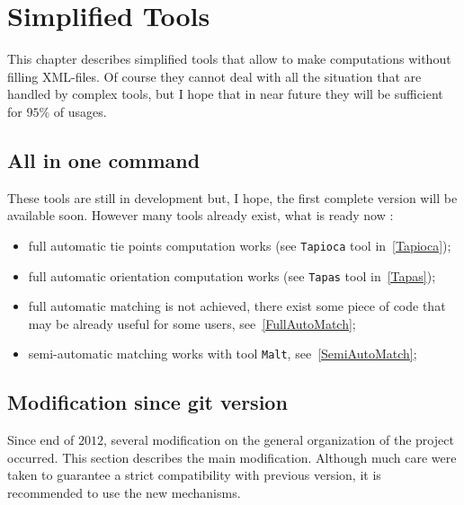 \chapter{Simplified Tools}

\label{Simp:Tool:One}


This chapter describes simplified tools that allow to make
computations without filling XML-files.
Of course they cannot deal with all the situation that are
handled by complex tools, but I hope that in near future they
will be sufficient for $95\%$ of usages.


\section{All in one command}


These tools are still in development but, I hope, the first complete version
will be available soon. However many tools already exist, what is ready now :



\begin{itemize}
    \item full automatic tie points computation works (see {\tt Tapioca} tool in~\ref{Tapioca});
    \item full automatic orientation computation works (see {\tt Tapas} tool in~\ref{Tapas});
    \item full automatic matching is not achieved,  there exist some piece  of
	  code that may be already useful for some users, see~\ref{FullAutoMatch};
    \item semi-automatic matching works with tool {\tt Malt}, see~\ref{SemiAutoMatch};
\end{itemize}



\section{Modification since git version}

\label{MERCURIAL}

Since end of $2012$, several modification on the general organization of the project occurred.
This section describes the main modification. Although much care were taken to guarantee a strict
compatibility with previous version, it is recommended to use the new mechanisms.


